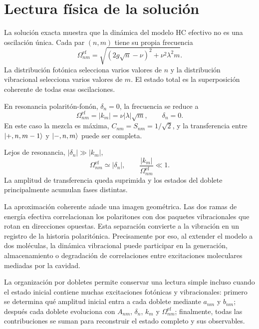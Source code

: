 \documentclass[11pt]{article}
\begin{document}
\section{Lectura f\'isica de la soluci\'on}

La soluci\'on exacta muestra que la din\'amica del modelo HC efectivo no es una
oscilaci\'on \'unica. Cada par $(n,m)$ tiene su propia frecuencia
\begin{equation}
  \Omega_{nm}^{\mathrm{ef}}
  =
  \sqrt{(2g\sqrt n-\nu)^2+\nu^2\lambda^2m}.
\end{equation}
La distribuci\'on fot\'onica selecciona varios valores de $n$ y la
distribuci\'on vibracional selecciona varios valores de $m$. El estado total
es la superposici\'on coherente de todas esas oscilaciones.

En resonancia polarit\'on-fon\'on, $\delta_n=0$, la frecuencia se reduce a
\begin{equation}
  \boxed{
  \Omega_{nm}^{\mathrm{ef}}
  =
  |k_m|
  =
  \nu|\lambda|\sqrt m,
  \qquad
  \delta_n=0.
  }
\end{equation}
En este caso la mezcla es m\'axima,
$C_{nm}=S_{nm}=1/\sqrt2$, y la transferencia entre
$\ket{+,n,m-1}$ y $\ket{-,n,m}$ puede ser completa.

Lejos de resonancia, $|\delta_n|\gg|k_m|$,
\begin{equation}
  \Omega_{nm}^{\mathrm{ef}}
  \simeq|\delta_n|,
  \qquad
  \frac{|k_m|}{\Omega_{nm}^{\mathrm{ef}}}\ll1.
\end{equation}
La amplitud de transferencia queda suprimida y los estados del doblete
principalmente acumulan fases distintas.

La aproximaci\'on coherente a\'nade una imagen geom\'etrica. Las dos ramas de
energ\'ia efectiva correlacionan los polaritones con dos paquetes
vibracionales que rotan en direcciones opuestas. Esta separaci\'on convierte a
la vibraci\'on en un registro de la historia polarit\'onica. Precisamente por
eso, al extender el modelo a dos mol\'eculas, la din\'amica vibracional puede
participar en la generaci\'on, almacenamiento o degradaci\'on de correlaciones
entre excitaciones moleculares mediadas por la cavidad.

\bigskip

La organizaci\'on por dobletes permite conservar una lectura simple incluso
cuando el estado inicial contiene muchas excitaciones fot\'onicas y
vibracionales: primero se determina qu\'e amplitud inicial entra a cada
doblete mediante $a_{nm}$ y $b_{nm}$; despu\'es cada doblete evoluciona con
$A_{nm}$, $\delta_n$, $k_m$ y $\Omega_{nm}^{\mathrm{ef}}$; finalmente, todas
las contribuciones se suman para reconstruir el estado completo y sus
observables.
\end{document}
